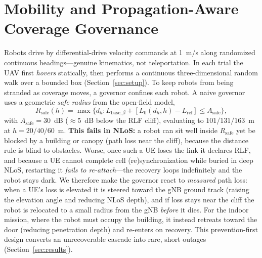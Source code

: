 \documentclass[10pt, conference]{IEEEtran}
\begin{document}
\section{Mobility and Propagation-Aware Coverage Governance}
\label{sec:control}
Robots drive by differential-drive velocity commands at 1~m/s along randomized
continuous headings---genuine kinematics, not teleportation. In each trial the UAV
first \emph{hovers} statically, then performs a continuous three-dimensional random
walk over a bounded box (Section~\ref{sec:setup}). To keep robots from being
stranded as coverage moves, a governor confines each robot. A naive governor uses a
geometric \emph{safe radius} from the open-field model,
\begin{equation}
\label{eq:rsafe}
R_{\mathrm{safe}}(h)=\max\{ d_h : L_{\mathrm{base},\beta}+[L_0(d_h,h)-L_{\mathrm{ref}}]\le A_{\mathrm{safe}}\},
\end{equation}
with $A_{\mathrm{safe}}{=}30$~dB (${\approx}5$~dB below the RLF cliff), evaluating
to $101/131/163$~m at $h{=}20/40/60$~m. \textbf{This fails in NLoS:} a robot can
sit well inside $R_{\mathrm{safe}}$ yet be blocked by a building or canopy (path
loss near the cliff), because the distance rule is blind to obstacles. Worse, once
such a UE loses the link it declares RLF, and because a UE cannot complete cell
(re)synchronization while buried in deep NLoS, restarting it \emph{fails to
re-attach}---the recovery loops indefinitely and the robot stays dark. We therefore
make the governor react to \emph{measured} path loss: when a UE's loss is elevated
it is steered toward the gNB ground track (raising the elevation angle and reducing
NLoS depth), and if loss stays near the cliff the robot is relocated to a small
radius from the gNB \emph{before} it dies. For the indoor mission, where the robot
must occupy the building, it instead retreats toward the door (reducing penetration
depth) and re-enters on recovery. This prevention-first design converts an
unrecoverable cascade into rare, short outages (Section~\ref{sec:results}).
\end{document}
